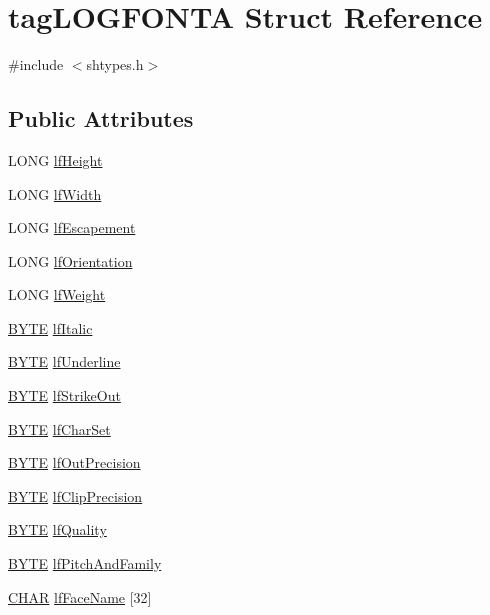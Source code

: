 \hypertarget{structtag_l_o_g_f_o_n_t_a}{}\section{tag\+L\+O\+G\+F\+O\+N\+TA Struct Reference}
\label{structtag_l_o_g_f_o_n_t_a}


{\ttfamily \#include $<$shtypes.\+h$>$}

\subsection*{Public Attributes}
\begin{DoxyCompactItemize}
\item 
L\+O\+NG \hyperlink{structtag_l_o_g_f_o_n_t_a_a85e64f1fe48a7683d20033139a94c78f}{lf\+Height}
\item 
L\+O\+NG \hyperlink{structtag_l_o_g_f_o_n_t_a_ad9b779faf6abe15cebae5eeb4b172b2b}{lf\+Width}
\item 
L\+O\+NG \hyperlink{structtag_l_o_g_f_o_n_t_a_abd471112e5265cbaa79bcfe1ec54be1c}{lf\+Escapement}
\item 
L\+O\+NG \hyperlink{structtag_l_o_g_f_o_n_t_a_a1f0c8507c41b12a6497097728889a13b}{lf\+Orientation}
\item 
L\+O\+NG \hyperlink{structtag_l_o_g_f_o_n_t_a_a340caaf99719db93b514ce4df408a77d}{lf\+Weight}
\item 
\hyperlink{mapinls_8h_a4ae1dab0fb4b072a66584546209e7d58}{B\+Y\+TE} \hyperlink{structtag_l_o_g_f_o_n_t_a_a9ff6272dec9cbd7f3ca16d921f0f1041}{lf\+Italic}
\item 
\hyperlink{mapinls_8h_a4ae1dab0fb4b072a66584546209e7d58}{B\+Y\+TE} \hyperlink{structtag_l_o_g_f_o_n_t_a_afec960775c444b7410d17b3092dba564}{lf\+Underline}
\item 
\hyperlink{mapinls_8h_a4ae1dab0fb4b072a66584546209e7d58}{B\+Y\+TE} \hyperlink{structtag_l_o_g_f_o_n_t_a_a7feb83de4d2006034125a24145ac106d}{lf\+Strike\+Out}
\item 
\hyperlink{mapinls_8h_a4ae1dab0fb4b072a66584546209e7d58}{B\+Y\+TE} \hyperlink{structtag_l_o_g_f_o_n_t_a_ab2bddca4d4d8a96b7055161a5bd168d2}{lf\+Char\+Set}
\item 
\hyperlink{mapinls_8h_a4ae1dab0fb4b072a66584546209e7d58}{B\+Y\+TE} \hyperlink{structtag_l_o_g_f_o_n_t_a_a71231f16e62d7a2285f516d61a45a3f2}{lf\+Out\+Precision}
\item 
\hyperlink{mapinls_8h_a4ae1dab0fb4b072a66584546209e7d58}{B\+Y\+TE} \hyperlink{structtag_l_o_g_f_o_n_t_a_af226b853d3bf83929536361f970c2e31}{lf\+Clip\+Precision}
\item 
\hyperlink{mapinls_8h_a4ae1dab0fb4b072a66584546209e7d58}{B\+Y\+TE} \hyperlink{structtag_l_o_g_f_o_n_t_a_a2a2f970fbfe56114f5e0d8ac678bae69}{lf\+Quality}
\item 
\hyperlink{mapinls_8h_a4ae1dab0fb4b072a66584546209e7d58}{B\+Y\+TE} \hyperlink{structtag_l_o_g_f_o_n_t_a_ab3e080f497692d73ed8c9bfab8f6eaf7}{lf\+Pitch\+And\+Family}
\item 
\hyperlink{mapinls_8h_aebb9e13210d88d43e32e735ada43a425}{C\+H\+AR} \hyperlink{structtag_l_o_g_f_o_n_t_a_ab243e85abc72f342dfc06b93648393f8}{lf\+Face\+Name} \mbox{[}32\mbox{]}
\end{DoxyCompactItemize}


